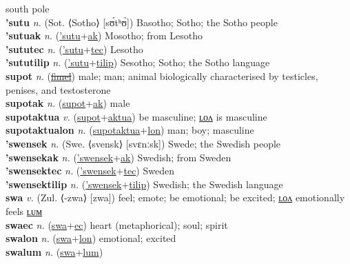 south pole \label{sutatyen} \\
\textbf{'sutu} \textit{n.} (Sot. ⟨Sotho⟩ [sʊ́tʰʊ̀])
Basotho; Sotho; the Sotho people \label{'sutu} \\
\textbf{'sutuak} \textit{n.} (\hyperref['sutu]{'sutu}+\hyperref[ak]{ak})
Mosotho; from Lesotho \label{'sutuak} \\
\textbf{'sututec} \textit{n.} (\hyperref['sutu]{'sutu}+\hyperref[tec]{tec})
Lesotho \label{'sututec} \\
\textbf{'sututilip} \textit{n.} (\hyperref['sutu]{'sutu}+\hyperref[tilip]{tilip})
Sesotho; Sotho; the Sotho language \label{'sututilip} \\
\textbf{supot} \textit{n.} (\hyperref[fimel]{\sout{fimel}})
male; man; animal biologically characterised by testicles, penises, and testosterone \label{supot} \\
\textbf{supotak} \textit{n.} (\hyperref[supot]{supot}+\hyperref[ak]{ak})
male \label{supotak} \\
\textbf{supotaktua} \textit{v.} (\hyperref[supot]{supot}+\hyperref[aktua]{aktua})
be masculine; \hyperref[supotaktualon]{ʟᴏᴧ} is masculine \label{supotaktua} \\
\textbf{supotaktualon} \textit{n.} (\hyperref[supotaktua]{supotaktua}+\hyperref[lon]{lon})
man; boy; masculine \label{supotaktualon} \\
\textbf{'swensek} \textit{n.} (Swe. ⟨svensk⟩ [svɛnːsk])
Swede; the Swedish people \label{'swensek} \\
\textbf{'swensekak} \textit{n.} (\hyperref['swensek]{'swensek}+\hyperref[ak]{ak})
Swedish; from Sweden \label{'swensekak} \\
\textbf{'swensektec} \textit{n.} (\hyperref['swensek]{'swensek}+\hyperref[tec]{tec})
Sweden \label{'swensektec} \\
\textbf{'swensektilip} \textit{n.} (\hyperref['swensek]{'swensek}+\hyperref[tilip]{tilip})
Swedish; the Swedish language \label{'swensektilip} \\
\textbf{swa} \textit{v.} (Zul. ⟨-zwa⟩ [zwa])
feel; emote; be emotional; be excited; \hyperref[swalon]{ʟᴏᴧ} emotionally feels \hyperref[swalum]{ʟᴜᴍ} \label{swa} \\
\textbf{swaec} \textit{n.} (\hyperref[swa]{swa}+\hyperref[ec]{ec})
heart (metaphorical); soul; spirit \label{swaec} \\
\textbf{swalon} \textit{n.} (\hyperref[swa]{swa}+\hyperref[lon]{lon})
emotional; excited \label{swalon} \\
\textbf{swalum} \textit{n.} (\hyperref[swa]{swa}+\hyperref[lum]{lum})
